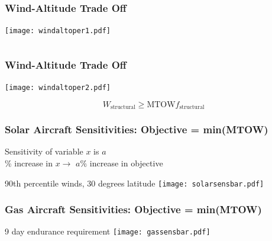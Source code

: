 \documentclass{beamer}
\begin{document}
\begin{frame}
    \frametitle{Wind-Altitude Trade Off}

    \begin{center}
    \texttt{[image: windaltoper1.pdf]} \\
    \end{center}
    
    \[ \]

\end{frame}

\begin{frame}
    \frametitle{Wind-Altitude Trade Off}

    \begin{center}
    \texttt{[image: windaltoper2.pdf]} \\
    \end{center}
    
    \[ W_{\text{structural}} \geq \text{MTOW} f_{\text{structural}} \]

\end{frame}


\begin{frame}
    \frametitle{Solar Aircraft Sensitivities: Objective = min(MTOW)}

    \pause
    Sensitivity of variable $x$ is $a$ \\
    \% increase in $x \rightarrow$ $a\%$ increase in objective 
    \pause
    \begin{center}
        \scriptsize
        90th percentile winds, 30 degrees latitude
    \texttt{[image: solarsensbar.pdf]} 
    \end{center}

\end{frame}

\begin{frame}
    \frametitle{Gas Aircraft Sensitivities: Objective = min(MTOW)}
    
    \pause
    
    \begin{center}
        \scriptsize
        9 day endurance requirement
    \texttt{[image: gassensbar.pdf]} 
    \end{center}

\end{frame}
\end{document}
